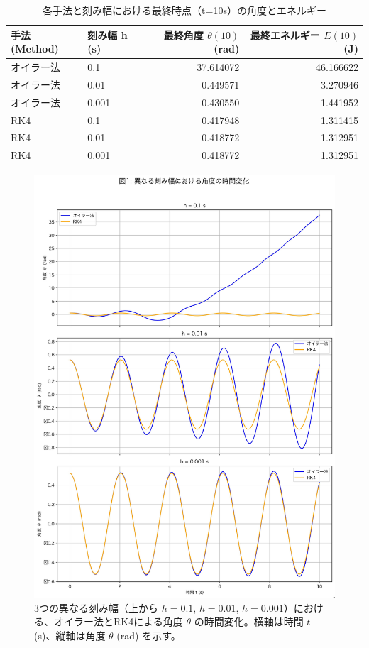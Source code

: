 \documentclass{article}
\begin{document}
\begin{table}[htbp]
  \centering
  \caption{各手法と刻み幅における最終時点（t=10s）の角度とエネルギー}
  \label{tab:results}
  \begin{tabular}{llrr}
    \toprule
    手法 (Method) & 刻み幅 h (s) & 最終角度 $\theta(10)$ (rad) & 最終エネルギー $E(10)$ (J) \\
    \midrule
    オイラー法 & 0.1 & 37.614072 & 46.166622 \\
    オイラー法 & 0.01 & 0.449571 & 3.270946 \\
    オイラー法 & 0.001 & 0.430550 & 1.441952 \\
    \midrule
    RK4 & 0.1 & 0.417948 & 1.311415 \\
    RK4 & 0.01 & 0.418772 & 1.312951 \\
    RK4 & 0.001 & 0.418772 & 1.312951 \\
    \bottomrule
  \end{tabular}
\end{table}

\begin{figure}[htbp]
  \centering
  \includegraphics[width=\textwidth]{図1_角度の時間変化.jpg}
  \caption{3つの異なる刻み幅（上から $h=0.1$, $h=0.01$, $h=0.001$）における、オイラー法とRK4による角度 $\theta$ の時間変化。横軸は時間 $t$ (s)、縦軸は角度 $\theta$ (rad) を示す。}
  \label{fig:angle}
\end{figure}
\end{document}
